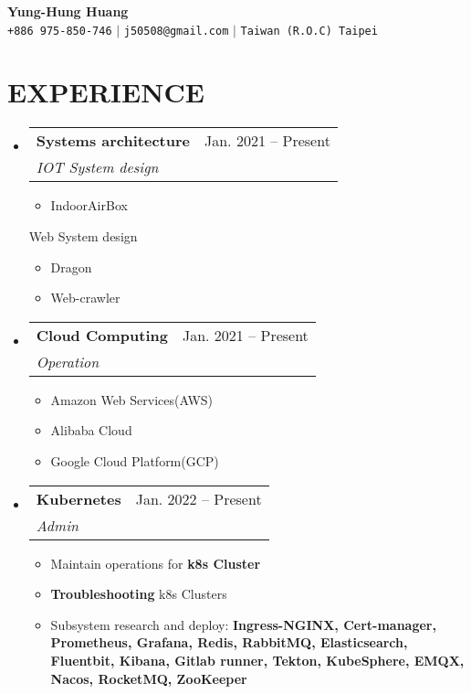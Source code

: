 \documentclass[letterpaper,11pt]{article}
\makeatletter
\newcommand{\resumeItem}[1]{
  \item\small{
    {#1 \vspace{-1pt}}
  }
}
\newcommand{\resumeSubheading}[4]{
  \vspace{-1pt}\item
    \begin{tabular*}{\textwidth}[t]{l@{\extracolsep{\fill}}r}
      \textbf{#1} & {\color{dark-grey}\small #2}\vspace{1pt}\\ %
      \textit{#3} & {\color{dark-grey} \small #4}\\ %
    \end{tabular*}\vspace{-4pt}
}
\newcommand{\resumeSubHeadingListStart}{\begin{itemize}[leftmargin=0in, label={}]}
\newcommand{\resumeSubHeadingListEnd}{\end{itemize}}
\newcommand{\resumeItemListStart}{\begin{itemize}}
\newcommand{\resumeItemListEnd}{\end{itemize}\vspace{0pt}}
\makeatother
\begin{document}
\begin{center}
    \textbf{\Huge Yung-Hung Huang} \\ \vspace{5pt}
    \small \faPhone* \texttt{+886 975-850-746} \hspace{1pt} $|$
    \hspace{1pt} \faEnvelope \hspace{2pt} \texttt{j50508@gmail.com} \hspace{1pt} $|$ 
    \hspace{1pt} \faMapMarker* \hspace{2pt}\texttt{Taiwan (R.O.C) Taipei}
    \\ \vspace{-3pt}
\end{center}

\section{EXPERIENCE}
  \resumeSubHeadingListStart

  \resumeSubheading
  {Systems architecture}{Jan. 2021 -- Present}
  {IOT System design}{}
  \resumeItemListStart    
    \resumeItem{IndoorAirBox}    
  \resumeItemListEnd
  {Web System design}{}
  \resumeItemListStart
    \resumeItem{Dragon}        
    \resumeItem{Web-crawler}    
  \resumeItemListEnd  

  \resumeSubheading
  {Cloud Computing}{Jan. 2021 -- Present}
  {Operation}{}      
  \resumeItemListStart
    \resumeItem{Amazon Web Services(AWS)}
    \resumeItem{Alibaba Cloud}
    \resumeItem{Google Cloud Platform(GCP)}    
  \resumeItemListEnd  

  \resumeSubheading
  {Kubernetes}{Jan. 2022 -- Present}
  {Admin}{}
  \resumeItemListStart
    \resumeItem{Maintain operations for \textbf{k8s Cluster} }
    \resumeItem{\textbf{Troubleshooting} k8s Clusters}
    \resumeItem{Subsystem research and deploy: \textbf{Ingress-NGINX, Cert-manager, Prometheus, Grafana, Redis, RabbitMQ, Elasticsearch, Fluentbit, Kibana, Gitlab runner, Tekton, KubeSphere, EMQX, Nacos, RocketMQ, ZooKeeper}}
  \resumeItemListEnd                 

  \resumeSubHeadingListEnd


\end{document}
